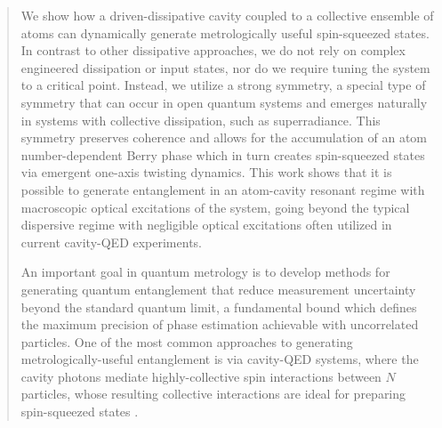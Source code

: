 

\begin{abstract}
We show how a driven-dissipative cavity coupled to a collective ensemble of atoms can dynamically generate metrologically useful spin-squeezed states. In contrast to other dissipative approaches, we do not rely on complex engineered dissipation or input states, nor do we require tuning the system to a critical point. Instead, we utilize a strong symmetry, a special type of symmetry that can occur in open quantum systems and emerges naturally in systems with collective dissipation, such as superradiance. This symmetry  preserves coherence and allows for the accumulation of an atom number-dependent Berry phase which in turn creates spin-squeezed states via emergent one-axis twisting dynamics. This work shows that it is possible to generate entanglement in an atom-cavity resonant regime with macroscopic optical excitations of the system, going beyond the typical dispersive regime with negligible optical excitations often utilized in current cavity-QED experiments. 


\pacs{}

\maketitle


An important goal in quantum metrology is to develop methods for generating quantum entanglement that reduce measurement uncertainty beyond the standard quantum limit, a fundamental bound  which defines the maximum precision of phase estimation achievable with uncorrelated particles. 
One of the most common approaches to generating metrologically-useful entanglement is via cavity-QED systems, where the cavity photons mediate highly-collective spin interactions between $N$ particles, whose resulting collective interactions are ideal for preparing spin-squeezed states \cite{Kitagawa1993, Wineland1992, Wineland1994, Pezze2018}. 


\end{abstract}

